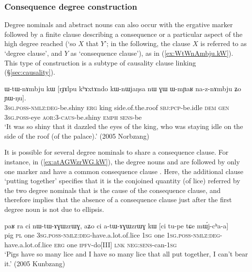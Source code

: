 \subsubsection{Consequence degree construction} \label{sec:degree.consequence}
Degree nominals and abstract nouns can also occur with the ergative marker  followed by a finite clause describing a consequence or a particular aspect of the high degree reached (`so $X$ that $Y$'; in the following, the clause $X$ is referred to as `degree clause', and $Y$ as `consequence clause'), as in (\ref{ex:WtWnAmbju.kW}). This type of construction is a subtype of causality clause linking (§\ref{sec:causality}).

\begin{exe}
\ex \label{ex:WtWnAmbju.kW}
\gll ɯ-tɯ-nɤmbju kɯ [rɟɤlpu kʰɤxtɤndo kɯ-nɯjaŋsa nɯ ɣɯ ɯ-mɲaʁ na-z-nɤmbju ʑo ɲɯ-ŋu]. \\
\textsc{3sg}.\textsc{poss}-\textsc{nmlz}:\textsc{deg}-be.shiny \textsc{erg} king side.of.the.roof \textsc{sbj}:\textsc{pcp}-be.idle \textsc{dem} \textsc{gen} \textsc{3sg}.\textsc{poss}-eye \textsc{aor}:3\flobv{}-\textsc{caus}-be.shiny \textsc{emph} \textsc{sens}-be\\
\glt `It was so shiny that it dazzled the eyes of the king, who was staying idle on the side of the roof (of the palace).' (2005 Norbzang)
\end{exe}

It is possible for several degree nominals to share a consequence clause. For instance, in (\ref{ex:atAGWzrWG.kW}), the degree nouns  and  are followed by only one marker  and have a common consequence clause . Here, the additional clause  `putting together' specifies that it is the conjoined quantity (of lice) referred by the two degree nominals that is the cause of the consequence clause, and therefore implies that the absence of a consequence clause just after the first degree noun  is not due to ellipsis.

\begin{exe}
\ex \label{ex:atAGWzrWG.kW}
\gll paʁ ra ci nɯ-tɯ-ɤɣɯzrɯɣ, aʑo ci a-tɯ-ɤɣɯzrɯɣ kɯ [ci tu-pe tɕe mɯ́j-cʰa-a] \\
pig \textsc{pl} one \textsc{3sg}.\textsc{poss}-\textsc{nmlz}:\textsc{deg}-have.a.lot.of.lice \textsc{1sg} one \textsc{1sg}.\textsc{poss}-\textsc{nmlz}:\textsc{deg}-have.a.lot.of.lice \textsc{erg} one \textsc{ipfv}-do[III] \textsc{lnk} \textsc{neg}:\textsc{sens}-can-\textsc{1sg} \\
\glt `Pigs have so many lice and I have so many lice that all put together, I can't bear it.' (2005 Kunbzang)
\end{exe}

